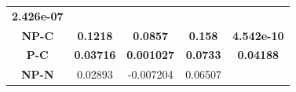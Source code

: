 \documentclass[]{article}
\begin{document}
\begin{longtable}[]{@{}ccccc@{}}
\begin{minipage}[t]{0.16\columnwidth}
\textbf{2.426e-07}
\strut\end{minipage}\tabularnewline
\begin{minipage}[t]{0.13\columnwidth}\centering\strut
\textbf{NP-C}
\strut\end{minipage} &
\begin{minipage}[t]{0.16\columnwidth}\centering\strut
\textbf{0.1218}
\strut\end{minipage} &
\begin{minipage}[t]{0.16\columnwidth}\centering\strut
\textbf{0.0857}
\strut\end{minipage} &
\begin{minipage}[t]{0.16\columnwidth}\centering\strut
\textbf{0.158}
\strut\end{minipage} &
\begin{minipage}[t]{0.16\columnwidth}\centering\strut
\textbf{4.542e-10}
\strut\end{minipage}\tabularnewline
\begin{minipage}[t]{0.13\columnwidth}\centering\strut
\textbf{P-C}
\strut\end{minipage} &
\begin{minipage}[t]{0.16\columnwidth}\centering\strut
\textbf{0.03716}
\strut\end{minipage} &
\begin{minipage}[t]{0.16\columnwidth}\centering\strut
\textbf{0.001027}
\strut\end{minipage} &
\begin{minipage}[t]{0.16\columnwidth}\centering\strut
\textbf{0.0733}
\strut\end{minipage} &
\begin{minipage}[t]{0.16\columnwidth}\centering\strut
\textbf{0.04188}
\strut\end{minipage}\tabularnewline
\begin{minipage}[t]{0.13\columnwidth}\centering\strut
\textbf{NP-N}
\strut\end{minipage} &
\begin{minipage}[t]{0.16\columnwidth}\centering\strut
0.02893
\strut\end{minipage} &
\begin{minipage}[t]{0.16\columnwidth}\centering\strut
-0.007204
\strut\end{minipage} &
\begin{minipage}[t]{0.16\columnwidth}\centering\strut
0.06507
\strut\end{minipage} &
\begin{minipage}[t]{0.16\columnwidth}\centering\strut

\end{minipage}
\end{longtable}
\end{document}
